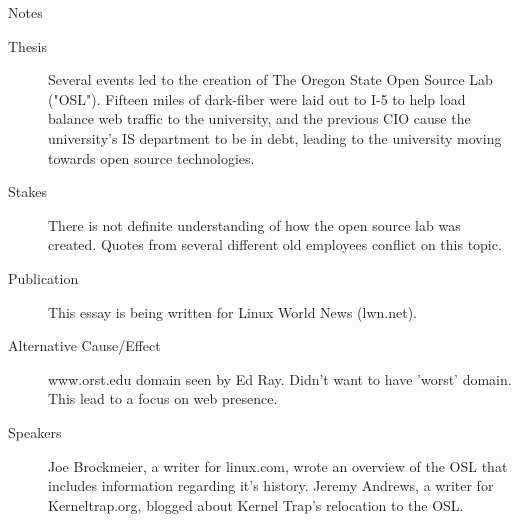 {\centering Notes\\}
\begin{description}
    \item[Thesis]
        Several events led to the creation of The Oregon State Open Source Lab 
("OSL"). Fifteen miles of dark-fiber were laid out to I-5 to help load balance
web traffic to the university, and the previous CIO cause the university's IS
department to be in debt, leading to the university moving towards open source
technologies.
    \item[Stakes]
        There is not definite understanding of how the open source lab was
created. Quotes from several different old employees conflict on this topic.
    \item[Publication]
        This essay is being written for Linux World News (lwn.net).
    \item[Alternative Cause/Effect]
        www.orst.edu domain seen by Ed Ray. Didn't want to have 'worst' domain.
This lead to a focus on web presence.
    \item[Speakers]
        Joe Brockmeier, a writer for linux.com, wrote an overview of the OSL
that includes information regarding it's history.
        Jeremy Andrews, a writer for Kerneltrap.org, blogged about Kernel
Trap's relocation to the OSL.
\end{description}

